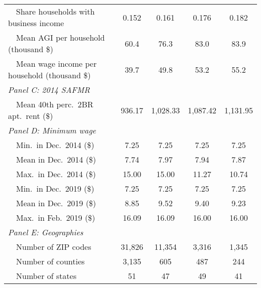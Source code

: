 \begin{landscape}
\begin{table}[hbt!]
\begin{tabular}{@{}lcccc@{}}
        $\quad$Share households with business income         & 0.152    & 0.161   & 0.176   & 0.182          \\
        $\quad$Mean AGI per household (thousand \$)          & 60.4 & 76.3 & 83.0 & 83.9     \\
        $\quad$Mean wage income per household (thousand \$)  & 39.7 & 49.8 & 53.2 & 55.2     \\
        \textit{Panel C: 2014 SAFMR}                         &       &       &        &               \\
        $\quad$Mean 40th perc.\ 2BR apt.\ rent (\$)          & 936.17   & 1,028.33  & 1,087.42  & 1,131.95          \\
        \textit{Panel D: Minimum wage}                       &       &       &        &              \\
        $\quad$Min.\ in Dec.\ 2014 (\$)                      & 7.25   & 7.25  & 7.25  & 7.25         \\
        $\quad$Mean in Dec.\ 2014 (\$)                       & 7.74   & 7.97  & 7.94  & 7.87         \\
        $\quad$Max.\ in Dec.\ 2014 (\$)                      & 15.00   & 15.00  & 11.27  & 10.74         \\
        $\quad$Min.\ in Dec.\ 2019 (\$)                      & 7.25   & 7.25  & 7.25  & 7.25         \\
        $\quad$Mean in Dec.\ 2019 (\$)                       & 8.85   & 9.52  & 9.40  & 9.23         \\
        $\quad$Max.\ in Feb.\ 2019 (\$)                      & 16.09   & 16.09  & 16.00  & 16.00         \\
        \textit{Panel E: Geographies}                        &       &       &        &               \\
        $\quad$Number of ZIP codes                           & 31,826  & 11,354 & 3,316 & 1,345             \\
        $\quad$Number of counties                            & 3,135  & 605 & 487 & 244             \\
        $\quad$Number of states                              & 51  & 47 & 49 & 41             \\ \bottomrule
    \end{tabular}


\end{table}
\end{landscape}
